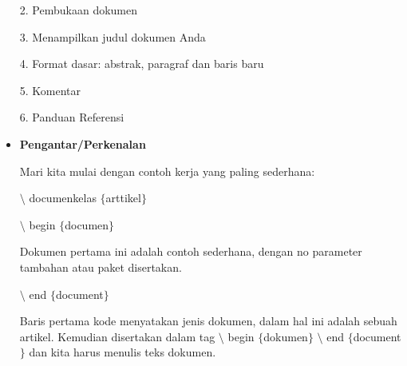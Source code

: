 \begin{itemize}
\hspace*{0.5in}2. Pembukaan dokumen\par

\hspace*{0.5in}3. Menampilkan judul dokumen Anda\par

\hspace*{0.5in}4. Format dasar: abstrak, paragraf dan baris baru\par

\hspace*{0.5in}5. Komentar\par

\hspace*{0.5in}6. Panduan Referensi\par

\vspace{10pt}

	\item {\fontsize{14pt}{14pt}\selectfont \textbf{Pengantar/Perkenalan}}\par
\vspace{\baselineskip}
Mari kita mulai dengan contoh kerja yang paling sederhana:\par

\hspace*{0.5in}$\setminus$ documenkelas $ \{ $arttikel$ \} $\par

\hspace*{0.5in}$\setminus$ begin $ \{ $documen$ \} $\par
\vspace{\baselineskip}

\hspace*{0.5in}Dokumen pertama ini adalah contoh sederhana, dengan no parameter tambahan atau paket \hspace*{0.5in}disertakan.\par

\hspace*{0.5in}$\setminus$ end $ \{ $document$ \} $\par

Baris pertama kode menyatakan jenis dokumen, dalam hal ini adalah sebuah artikel. Kemudian disertakan dalam tag $\setminus$ begin $ \{ $dokumen$ \} $ $\setminus$ end $ \{ $document$ \} $ dan kita harus menulis teks dokumen.\par


\end{itemize}
